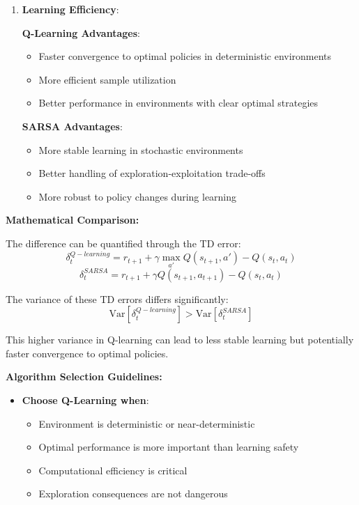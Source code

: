 \documentclass[12pt]{article}
\begin{document}
{{{\begin{enumerate}
    \item \textbf{Learning Efficiency}:
    
    \textbf{Q-Learning Advantages}:
    \begin{itemize}
        \item Faster convergence to optimal policies in deterministic environments
        \item More efficient sample utilization
        \item Better performance in environments with clear optimal strategies
    \end{itemize}
    
    \textbf{SARSA Advantages}:
    \begin{itemize}
        \item More stable learning in stochastic environments
        \item Better handling of exploration-exploitation trade-offs
        \item More robust to policy changes during learning
    \end{itemize}
\end{enumerate}

\textbf{Mathematical Comparison:}

The difference can be quantified through the TD error:
$$\delta_t^{Q-learning} = r_{t+1} + \gamma \max_{a'} Q(s_{t+1}, a') - Q(s_t, a_t)$$
$$\delta_t^{SARSA} = r_{t+1} + \gamma Q(s_{t+1}, a_{t+1}) - Q(s_t, a_t)$$

The variance of these TD errors differs significantly:
$$\text{Var}[\delta_t^{Q-learning}] > \text{Var}[\delta_t^{SARSA}]$$

This higher variance in Q-learning can lead to less stable learning but potentially faster convergence to optimal policies.

\textbf{Algorithm Selection Guidelines:}

\begin{itemize}
    \item \textbf{Choose Q-Learning when}:
    \begin{itemize}
        \item Environment is deterministic or near-deterministic
        \item Optimal performance is more important than learning safety
        \item Computational efficiency is critical
        \item Exploration consequences are not dangerous
    \end{itemize}
    

\end{itemize}}}}
\end{document}
